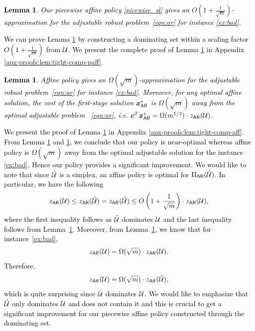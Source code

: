 \documentclass[11pt]{article}
\theoremstyle{plain}
\newtheorem{lemma}[theorem]{Lemma}
\theoremstyle{definition}
\numberwithin{equation}{section}%
\numberwithin{equation}{section}%
\newcommand{\mb}[1]{\ensuremath{\boldsymbol{#1}}}
\newcommand*{\red}{\textcolor{black}}
\begin{document}
\red{\begin{lemma}\label{lem:tight-comp-paff}
Our piecewise affine policy \eqref{picewise_sl} gives an $ O (1+ \frac{1}{\sqrt{m}})$-approximation for the adjustable robust problem~\eqref{eqn:ar} for instance \eqref{ex:bad}. %
\end{lemma}
We can prove Lemma \ref{lem:tight-comp-paff} by constructing a dominating set within a scaling factor $ O (1+ \frac{1}{\sqrt{m}})$ from ${\cal U}$. We present the complete proof of Lemma \ref{lem:tight-comp-paff} in Appendix \ref{apx-proofs:lem:tight-comp-paff}.
\begin{lemma}\label{lem:tight-comp-aff}
Affine policy  gives an $ \Omega ({\sqrt{m}})$-approximation for the adjustable robust problem~\eqref{eqn:ar} for instance \eqref{ex:bad}. Moreover, for any optimal affine solution, the cost of the first-stage solution $ \mb x^*_{\sf Aff}$ is $ \Omega ({\sqrt{m}})$ away from the optimal adjustable problem ~\eqref{eqn:ar}, i.e. $ \mb c^T \mb x^*_{\sf Aff} = \Omega(m^{1/2}) \cdot z_{\sf AR}({\cal U})$.
\end{lemma}
We present the proof of Lemma \ref{lem:tight-comp-aff} in Appendix \ref{apx-proofs:lem:tight-comp-aff}. From Lemma \ref{lem:tight-comp-aff} and \ref{lem:tight-comp-paff}, we conclude that our policy is near-optimal whereas affine policy is $ \Omega ( \sqrt{m})$ away from the optimal adjustable solution for the instance \eqref{ex:bad}. Hence our policy provides a significant improvement.  We would like to note that since $\hat{\cal U}$ is a simplex, an affine policy is optimal for $\Pi_{\sf AR}(\hat{\cal U})$. In particular, we have the following
\[z_{\sf AR}({\cal U}) \leq z_{\sf AR}(\hat{\cal U}) = z_{\sf Aff}(\hat{\cal U}) \leq O \left(1+\frac{1}{\sqrt{m}}\right) \cdot z_{\sf AR}({\cal U}),\]
where the first inequality follows as $\hat{\cal U}$ dominates ${\cal U}$ and the last inequality follows from Lemma~\ref{lem:tight-comp-paff}. Moreover, from Lemma~\ref{lem:tight-comp-aff}, we know that for instance~\eqref{ex:bad},
\[ z_{\sf Aff}({\cal U}) = \Omega(\sqrt{m}) \cdot z_{\sf AR}({\cal U}).\]
Therefore,
\[z_{\sf Aff}({\cal U}) = \Omega(\sqrt{m}) \cdot z_{\sf Aff}(\hat{\cal U}),\]
which is quite surprising since $\hat{\cal U}$ dominates ${\cal U}$. We would like to emphasize that $\hat{\cal U}$ only dominates ${\cal U}$ and does not contain it and this is crucial to get a significant improvement for our piecewise affine policy constructed through the dominating set.
\vspace{2mm}
}
\end{document}
